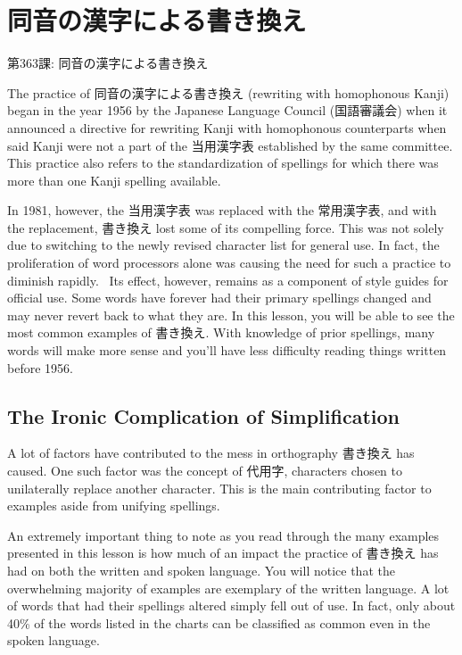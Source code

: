     
\chapter{同音の漢字による書き換え}

\begin{center}
\begin{Large}
第363課: 同音の漢字による書き換え 
\end{Large}
\end{center}
 
\par{ The practice of 同音の漢字による書き換え (rewriting with homophonous Kanji) began in the year 1956 by the Japanese Language Council (国語審議会) when it announced a directive for rewriting Kanji with homophonous counterparts when said Kanji were not a part of the 当用漢字表 established by the same committee. This practice also refers to the standardization of spellings for which there was more than one Kanji spelling available. }

\par{ In 1981, however, the 当用漢字表 was replaced with the 常用漢字表, and with the replacement, 書き換え lost some of its compelling force. This was not solely due to switching to the newly revised character list for general use. In fact, the proliferation of word processors alone was causing the need for such a practice to diminish rapidly.  Its effect, however, remains as a component of style guides for official use. Some words have forever had their primary spellings changed and may never revert back to what they are. In this lesson, you will be able to see the most common examples of 書き換え. With knowledge of prior spellings, many words will make more sense and you'll have less difficulty reading things written before 1956. }
      
\section{The Ironic Complication of Simplification}
 
\par{ A lot of factors have contributed to the mess in orthography 書き換え has caused. One such factor was the concept of 代用字, characters chosen to unilaterally replace another character. This is the main contributing factor to examples aside from unifying spellings. }

\par{ An extremely important thing to note as you read through the many examples presented in this lesson is how much of an impact the practice of 書き換え has had on both the written and spoken language. You will notice that the overwhelming majority of examples are exemplary of the written language. A lot of words that had their spellings altered simply fell out of use. In fact, only about 40\% of the words listed in the charts can be classified as common even in the spoken language. }

